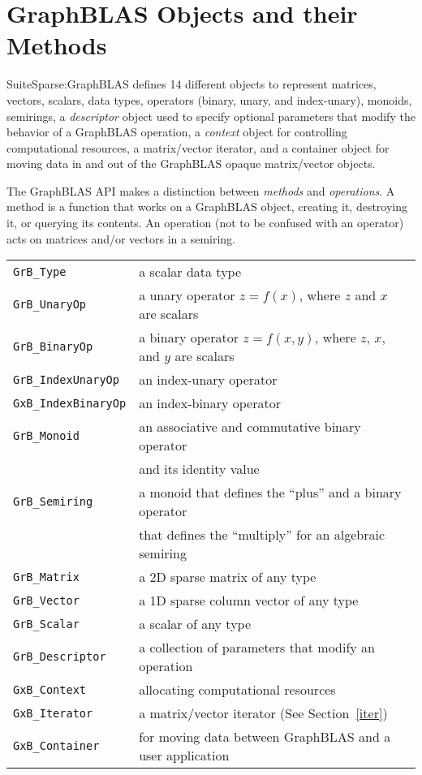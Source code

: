 
\newpage
\section{GraphBLAS Objects and their Methods} %
\label{objects}

SuiteSparse:GraphBLAS defines 14 different objects to represent matrices, vectors,
scalars, data types, operators (binary, unary, and index-unary), monoids,
semirings, a {\em descriptor} object used to specify optional parameters
that modify the behavior of a GraphBLAS operation, a {\em context}
object for controlling computational resources, a matrix/vector iterator,
and a container object for moving data in and out of the GraphBLAS opaque
matrix/vector objects.

The GraphBLAS API makes a distinction between {\em methods} and {\em
operations}.  A method is a function that works on a GraphBLAS object, creating
it, destroying it, or querying its contents.  An operation (not to be confused
with an operator) acts on matrices and/or vectors in a semiring.

\vspace{0.1in}
\noindent
{\small
\begin{tabular}{ll}
\hline
\verb'GrB_Type'      & a scalar data type \\
\verb'GrB_UnaryOp'   & a unary operator $z=f(x)$, where $z$ and $x$ are scalars\\
\verb'GrB_BinaryOp'  & a binary operator $z=f(x,y)$, where $z$, $x$, and $y$ are scalars\\
\verb'GrB_IndexUnaryOp'  & an index-unary operator \\
\verb'GxB_IndexBinaryOp'  & an index-binary operator \\
\verb'GrB_Monoid'    & an associative and commutative binary operator  \\
                     & and its identity value \\
\verb'GrB_Semiring'  & a monoid that defines the ``plus'' and a binary operator\\
                     & that defines the ``multiply'' for an algebraic semiring \\
\verb'GrB_Matrix'    & a 2D sparse matrix of any type \\
\verb'GrB_Vector'    & a 1D sparse column vector of any type \\
\verb'GrB_Scalar'    & a scalar of any type \\
\verb'GrB_Descriptor'& a collection of parameters that modify an operation \\
\verb'GxB_Context'   & allocating computational resources \\
\verb'GxB_Iterator'  & a matrix/vector iterator (See Section~\ref{iter}) \\
\verb'GxB_Container' & for moving data between GraphBLAS and a user application \\
\hline
\end{tabular}
}
\vspace{0.1in}


